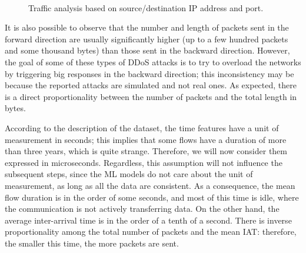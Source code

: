 \documentclass[acmlarge,nonacm]{acmart}
\begin{document}
\begin{figure}
	\centering
     \quad
	 \\
  	\caption{Traffic analysis based on source/destination IP address and port.} 
\end{figure}

It is also possible to observe that the number and length of packets sent in the forward direction are usually significantly higher (up to a few hundred packets and some thousand bytes) than those sent in the backward direction. However, the goal of some of these types of DDoS attacks is to try to overload the networks by triggering big responses in the backward direction; this inconsistency may be because the reported attacks are simulated and not real ones. As expected, there is a direct proportionality between the number of packets and the total length in bytes.

According to the description of the dataset, the time features have a unit of measurement in seconds; this implies that some flows have a duration of more than three years, which is quite strange. Therefore, we will now consider them expressed in microseconds. Regardless, this assumption will not influence the subsequent steps, since the ML models do not care about the unit of measurement, as long as all the data are consistent. As a consequence, the mean flow duration is in the order of some seconds, and most of this time is idle, where the communication is not actively transferring data. On the other hand, the average inter-arrival time is in the order of a tenth of a second. There is inverse proportionality among the total number of packets and the mean IAT: therefore, the smaller this time, the more packets are sent. 
\end{document}
